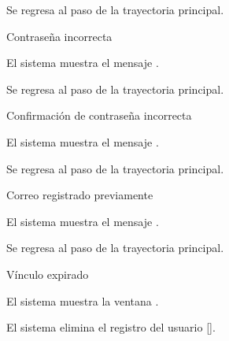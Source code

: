 {\begin{trayectoriaAlternativa}
    \item Se regresa al paso  de la trayectoria
      principal.

  \end{trayectoriaAlternativa}

  \begin{trayectoriaAlternativa}
    {Contraseña incorrecta}

    \item El sistema muestra el mensaje
      .

    \item Se regresa al paso  de la trayectoria
      principal.

  \end{trayectoriaAlternativa}

  \begin{trayectoriaAlternativa}
    {Confirmación de contraseña incorrecta}

    \item El sistema muestra el mensaje
      .

    \item Se regresa al paso  de la trayectoria
      principal.

  \end{trayectoriaAlternativa}

  \begin{trayectoriaAlternativa}
    {Correo registrado previamente}

    \item El sistema muestra el mensaje
      .

    \item Se regresa al paso  de la trayectoria
      principal.

  \end{trayectoriaAlternativa}

  \begin{trayectoriaAlternativa}
    {Vínculo expirado}

    \item El sistema muestra la ventana
      .

    \item El sistema elimina el registro del usuario
      [].

  \end{trayectoriaAlternativa}

}
